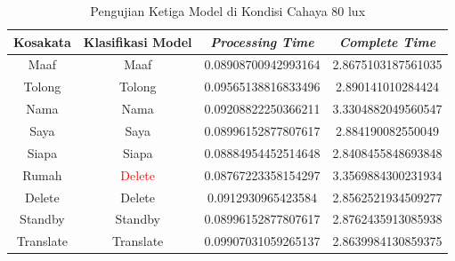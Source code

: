 \begin{longtable}{|c|c|c|c|}
  \caption{Pengujian Ketiga Model di Kondisi Cahaya 80 lux}
  \label{tb:prediksiremang3}                                   \\
  \hline
  \rowcolor[HTML]{C0C0C0}
  \textbf{Kosakata} & \textbf{Klasifikasi Model} & \textbf{\emph{Processing Time}} & \textbf{\emph{Complete Time}}\\
  \hline
  Maaf              & Maaf                        & 0.08908700942993164                           & 2.8675103187561035                                  \\
  Tolong            & Tolong                        & 0.09565138816833496                           & 2.890141010284424                                  \\
  Nama              & Nama                        & 0.09208822250366211                           & 3.3304882049560547                                  \\
  Saya              & Saya                        & 0.08996152877807617                           & 2.884190082550049                                  \\
  Siapa              & Siapa                        & 0.08884954452514648                           & 2.8408455848693848                                  \\
  Rumah             & \textcolor{red}{Delete}                        & 0.08767223358154297                           & 3.3569884300231934                                  \\
  Delete            & Delete                        & 0.0912930965423584                            & 2.8562521934509277                                  \\
  Standby           & Standby                        & 0.08996152877807617                           & 2.8762435913085938                                  \\
  Translate         & Translate                        & 0.09907031059265137                           &2.8639984130859375                                  \\
  \hline
\end{longtable}

